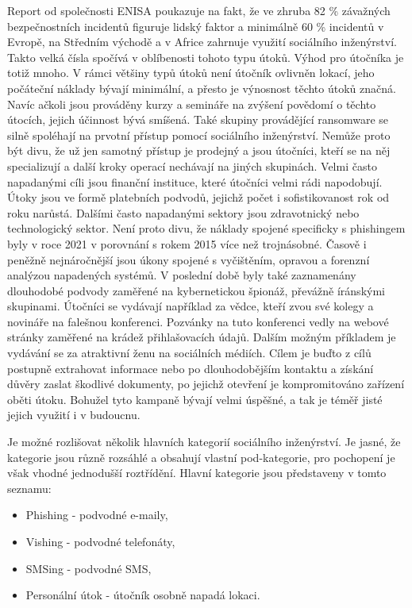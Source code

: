 Report od společnosti \ac{ENISA} poukazuje na fakt, že ve zhruba 82 \% závažných bezpečnostních incidentů figuruje lidský faktor a minimálně 60 \% incidentů v Evropě, na Středním východě a v Africe zahrnuje využití sociálního inženýrství.
Takto velká čísla spočívá v oblíbenosti tohoto typu útoků.
Výhod pro útočníka je totiž mnoho.
V rámci většiny typů útoků není útočník ovlivněn lokací, jeho počáteční náklady bývají minimální, a přesto je výnosnost těchto útoků značná.
Navíc ačkoli jsou prováděny kurzy a semináře na zvýšení povědomí o těchto útocích, jejich účinnost bývá smíšená.
Také skupiny provádějící ransomware se silně spoléhají na prvotní přístup pomocí sociálního inženýrství.
Nemůže proto být divu, že už jen samotný přístup je prodejný a jsou útočníci, kteří se na něj specializují a další kroky operací nechávají na jiných skupinách.
Velmi často napadanými cíli jsou finanční instituce, které útočníci velmi rádi napodobují.
Útoky jsou ve formě platebních podvodů, jejichž počet i sofistikovanost rok od roku narůstá.
Dalšími často napadanými sektory jsou zdravotnický nebo technologický sektor.
Není proto divu, že náklady spojené specificky s phishingem byly v roce 2021 v porovnání s rokem 2015 více než trojnásobné.
Časově i peněžně nejnáročnější jsou úkony spojené s vyčištěním, opravou a forenzní analýzou napadených systémů.
V poslední době byly také zaznamenány dlouhodobé podvody zaměřené na kybernetickou špionáž, převážně íránskými skupinami.
Útočníci se vydávají například za vědce, kteří zvou své kolegy a novináře na falešnou konferenci.
Pozvánky na tuto konferenci vedly na webové stránky zaměřené na krádež přihlašovacích údajů.
Dalším možným příkladem je vydávání se za atraktivní ženu na sociálních médiích.
Cílem je buďto z cílů postupně extrahovat informace nebo po dlouhodobějším kontaktu a získání důvěry zaslat škodlivé dokumenty, po jejichž otevření je kompromitováno zařízení oběti útoku.
Bohužel tyto kampaně bývají velmi úspěšné, a tak je téměř jisté jejich využití i v budoucnu.\cite{Enisa_thread_landscape}

Je možné rozlišovat několik hlavních kategorií sociálního inženýrství.
Je jasné, že kategorie jsou různě rozsáhlé a obsahují vlastní pod-kategorie, pro pochopení je však vhodné jednodušší roztřídění.
Hlavní kategorie jsou představeny v tomto seznamu:
\begin{itemize}
	\item Phishing - podvodné e-maily,
	\item Vishing - podvodné telefonáty,
	\item SMSing - podvodné \ac{SMS},
	\item Personální útok - útočník osobně napadá lokaci.
\end{itemize}\cite{Enisa_thread_landscape, moje_bakalarka}%


